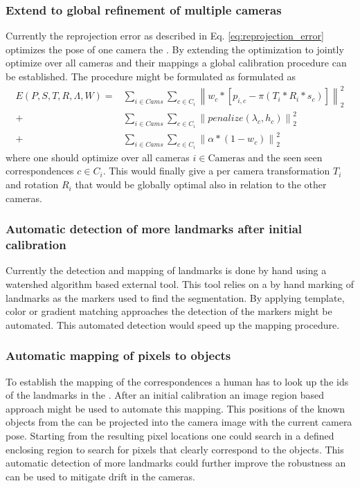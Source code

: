 \subsubsection{Extend to global refinement of multiple cameras}
Currently the reprojection error as described in Eq. \ref{eq:reprojection_error} optimizes the pose of one camera \wrt the \HDmaps{}.
By extending the optimization to jointly optimize over all cameras and their mappings a global calibration procedure can be established.
The procedure might be formulated as
formulated as
\begin{equation}
  \begin{split}
  E(P, S, T, R, \Lambda, W ) =& 
  \sum_{i \in Cams} \sum_{c \in C_i} 
  \left\lVert 
    w_c * [ p_{i,c} - \pi(T_i * R_i * s_c) ]
  \right\rVert_2^2 \\ 
  +& 
  \sum_{i \in Cams} \sum_{c \in C_i} 
  \left\lVert 
  penalize(\lambda_c, h_c)
  \right\rVert_2^2 \\ 
  +& 
  \sum_{i \in Cams} \sum_{c \in C_i} 
  \left\lVert 
  \alpha * (1 - w_c)
  \right\rVert_2^2 
\end{split}
\label{eq:reprojection_error_global}
\end{equation}
where one should optimize over all cameras $i \in \text{Cameras}$ and the seen seen correspondences $c \in C_i$.
This would finally give a per camera transformation $T_i$ and rotation $R_i$ that would be globally optimal also in relation to the other cameras.

\subsubsection{Automatic detection of more landmarks after initial calibration}
\label{sec:auto_detection_landmarks}
Currently the detection and mapping of landmarks is done by hand using a watershed algorithm \cite{meyer1992color,opencv_library} based external tool.
This tool relies on a by hand marking of landmarks as the markers used to find the segmentation.
By applying template, color or gradient matching approaches the detection of the markers might be automated.
This automated detection would speed up the mapping procedure. 

\subsubsection{Automatic mapping of pixels to objects}
\label{sec:auto_mapping_landmarks}
To establish the mapping of the correspondences a human has to look up the ids of the landmarks in the \HDmaps{}.
After an initial calibration an image region based approach might be used to automate this mapping.
This positions of the known objects from the \HDmaps{} can be projected into the camera image with the current camera pose.
Starting from the resulting pixel locations one could search in a defined enclosing region to search for pixels that clearly correspond to the objects.
This automatic detection of more landmarks could further improve the robustness an can be used to mitigate drift in the cameras.  

